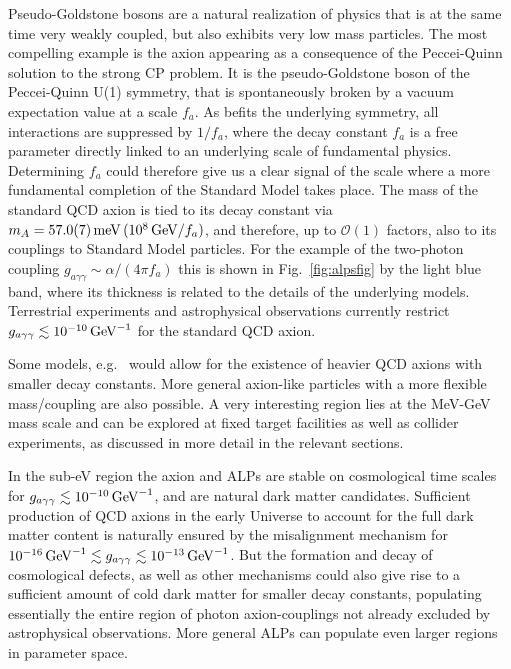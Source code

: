 \documentclass[../report.tex]{subfiles}
\begin{document}
Pseudo-Goldstone bosons are a natural realization of physics that is at the same time very weakly coupled, but also exhibits very low mass particles. The most compelling example is the axion
appearing as a consequence of the Peccei-Quinn solution
to the strong CP problem. It is the pseudo-Goldstone boson of the Peccei-Quinn U(1) symmetry, that is spontaneously broken by a vacuum expectation value at a scale $f_{a}$. As befits the underlying symmetry, all interactions are suppressed by $1/f_{a}$, where
 the decay constant $f_{a}$ is   a free parameter directly linked to an underlying scale of fundamental physics.
Determining $f_{a}$ could therefore give us a clear signal of the scale where a more fundamental completion of the Standard Model takes place.
The mass of the standard QCD axion is tied to its decay constant via $m_A=57.0(7)\,{\rm meV}\,(10^8\,{\rm GeV}/f_a)$,
and therefore, up to ${\mathcal{O}}(1)$ factors, also to its couplings to Standard Model particles. For the example of the two-photon coupling $g_{a\gamma\gamma}\sim \alpha/(4\pi f_{a})$ this is shown in Fig.~\ref{fig:alpsfig} by the light blue band, where its thickness is related to the details of the underlying models.
Terrestrial experiments and astrophysical observations currently restrict $g_{a\gamma\gamma}\lesssim 10^{-10}\,{\rm GeV}^{-1}$ for the standard QCD
axion.

Some models, e.g.~\cite{Agrawal:2017ksf,Gaillard:2018xgk} would allow for the existence of heavier QCD axions with smaller decay constants. 
More general axion-like particles with a more flexible mass/coupling are also possible.
A very interesting region lies at the MeV-GeV mass scale and can be explored at fixed target facilities as well as collider experiments, as discussed in more detail in the relevant sections.

In the sub-eV region the axion and ALPs are stable on cosmological time scales for $g_{a\gamma\gamma}\lesssim 10^{-10}\,{\rm GeV}^{-1}$,
and are natural dark matter candidates.
Sufficient production of QCD axions in the early Universe to account for the full dark matter content is naturally ensured by the misalignment mechanism for $10^{-16}\,{\rm GeV}^{-1}\lesssim g_{a\gamma\gamma}\lesssim 10^{-13}\,{\rm GeV}^{-1}$. But the formation and decay of cosmological defects, as well as other mechanisms could also give rise to a sufficient amount of cold dark matter for smaller decay constants, populating essentially the entire region of photon axion-couplings not already excluded by astrophysical observations. More general ALPs can populate even larger regions in parameter space.
\end{document}
